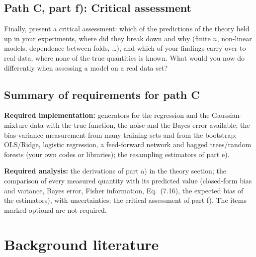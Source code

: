 \documentclass[11pt,a4paper]{article}
\begin{document}
\subsection*{Path C, part f): Critical assessment}

Finally, present a critical assessment: which of the predictions of the
theory held up in your experiments, where did they break down and why
(finite $n$, non-linear models, dependence between folds, \dots), and which
of your findings carry over to real data, where none of the true quantities
is known.  What would you now do differently when assessing a model on a
real data set?

\subsection*{Summary of requirements for path C}

\textbf{Required implementation:} generators for the regression and the
Gaussian-mixture data with the true function, the noise and the Bayes error
available; the bias-variance measurement from many training sets and from
the bootstrap; OLS/Ridge, logistic regression, a feed-forward network and
bagged trees/random forests (your own codes or libraries); the resampling
estimators of part e).

\textbf{Required analysis:} the derivations of part a) in the theory
section; the comparison of every measured quantity with its predicted value
(closed-form bias and variance, Bayes error, Fisher information, Eq.\ (7.16),
the expected bias of the estimators), with uncertainties; the critical
assessment of part f).  The items marked optional are not required.

\section*{Background literature}
\end{document}
